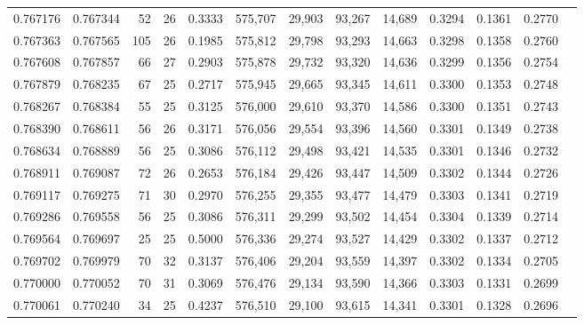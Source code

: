 \begin{tabular}{rrrrrrrrrrrrr}
0.767176 & 0.767344 &     52 &    26 &                                     0.3333 & 575,707 &  29,903 &  93,267 &  14,689 & 0.3294 & 0.1361 & 0.2770 \\
0.767363 & 0.767565 &    105 &    26 &                                     0.1985 & 575,812 &  29,798 &  93,293 &  14,663 & 0.3298 & 0.1358 & 0.2760 \\
0.767608 & 0.767857 &     66 &    27 &                                     0.2903 & 575,878 &  29,732 &  93,320 &  14,636 & 0.3299 & 0.1356 & 0.2754 \\
0.767879 & 0.768235 &     67 &    25 &                                     0.2717 & 575,945 &  29,665 &  93,345 &  14,611 & 0.3300 & 0.1353 & 0.2748 \\
0.768267 & 0.768384 &     55 &    25 &                                     0.3125 & 576,000 &  29,610 &  93,370 &  14,586 & 0.3300 & 0.1351 & 0.2743 \\
0.768390 & 0.768611 &     56 &    26 &                                     0.3171 & 576,056 &  29,554 &  93,396 &  14,560 & 0.3301 & 0.1349 & 0.2738 \\
0.768634 & 0.768889 &     56 &    25 &                                     0.3086 & 576,112 &  29,498 &  93,421 &  14,535 & 0.3301 & 0.1346 & 0.2732 \\
0.768911 & 0.769087 &     72 &    26 &                                     0.2653 & 576,184 &  29,426 &  93,447 &  14,509 & 0.3302 & 0.1344 & 0.2726 \\
0.769117 & 0.769275 &     71 &    30 &                                     0.2970 & 576,255 &  29,355 &  93,477 &  14,479 & 0.3303 & 0.1341 & 0.2719 \\
0.769286 & 0.769558 &     56 &    25 &                                     0.3086 & 576,311 &  29,299 &  93,502 &  14,454 & 0.3304 & 0.1339 & 0.2714 \\
0.769564 & 0.769697 &     25 &    25 &                                     0.5000 & 576,336 &  29,274 &  93,527 &  14,429 & 0.3302 & 0.1337 & 0.2712 \\
0.769702 & 0.769979 &     70 &    32 &                                     0.3137 & 576,406 &  29,204 &  93,559 &  14,397 & 0.3302 & 0.1334 & 0.2705 \\
0.770000 & 0.770052 &     70 &    31 &                                     0.3069 & 576,476 &  29,134 &  93,590 &  14,366 & 0.3303 & 0.1331 & 0.2699 \\
0.770061 & 0.770240 &     34 &    25 &                                     0.4237 & 576,510 &  29,100 &  93,615 &  14,341 & 0.3301 & 0.1328 & 0.2696 \\

\end{tabular}
